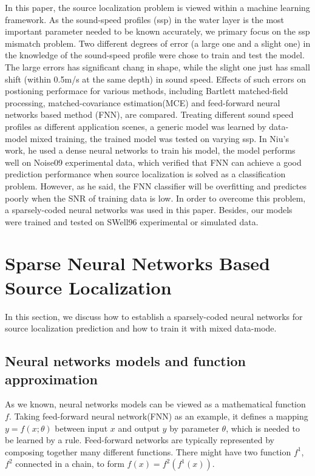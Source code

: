 In this paper, the source localization problem is viewed within a machine learning
framework. As the sound-speed profiles (ssp) in the water layer is the most important parameter needed to be known accurately\cite{feuillade1989environmental}, we primary focus on the ssp
mismatch problem.
Two different degrees of error (a large one and a slight one) in the knowledge of the sound-speed profile were chose to train and test the model.
The large errors has significant chang in shape, while the slight one just has small shift (within 0.5m/s at the same depth) in sound speed.
Effects of such errors on postioning performace for various methods, including Bartlett matched-field processing, matched-covariance estimation(MCE) and feed-forward neural networks based method (FNN), are compared.
Treating different sound speed profiles as different application scenes, a generic model was learned by data-model mixed training, the trained model was tested on
varying ssp.
In Niu's work\cite{niu2017source}, he used a dense neural networks to train his model, the model performs well on Noise09 experimental data, which verified that FNN can achieve a good prediction performance when source localization is solved as a classification problem. However, as he said, the FNN classifier will be overfitting and predictes poorly when the SNR of training data is low. In order to overcome this problem,
a sparsely-coded neural networks was used in this paper. Besides, our models were trained and tested on SWell96 experimental or simulated data.

\section{Sparse Neural Networks Based Source Localization}
In this section, we discuss how to establish a sparsely-coded neural networks for
source localization prediction and how to train it with mixed data-mode.

\subsection{Neural networks models and function approximation}
As we known, neural networks models can be viewed as a mathematical function $f$. Taking feed-forward neural network(FNN) as an example, it defines a mapping ${{y}}=f(x;\theta )$ between input $x$ and output $y$ by parameter $\theta$, which is needed to be learned by a rule. Feed-forward networks are typically represented by composing together many different functions. There might have two function $f^{1}$, $f^{2}$ connected in a chain\cite{goodfellow2016deep}, to form
$f(x) = f^{2}(f^{1}(x))$.

